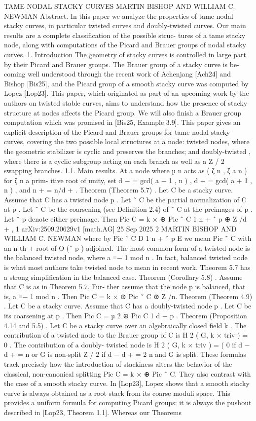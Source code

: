\documentclass{article}
\begin{document}
TAME NODAL STACKY CURVES MARTIN BISHOP AND WILLIAM C. NEWMAN Abstract. In this paper we analyze the properties of tame nodal stacky curves, in particular twisted curves and doubly-twisted curves. Our main results are a complete classification of the possible struc- tures of a tame stacky node, along with computations of the Picard and Brauer groups of nodal stacky curves. 1. Introduction The geometry of stacky curves is controlled in large part by their Picard and Brauer groups. The Brauer group of a stacky curve is be- coming well understood through the recent work of Achenjang [Ach24] and Bishop [Bis25], and the Picard group of a smooth stacky curve was computed by Lopez [Lop23]. This paper, which originated as part of an upcoming work by the authors on twisted stable curves, aims to understand how the presence of stacky structure at nodes affects the Picard group. We will also finish a Brauer group computation which was promised in [Bis25, Example 3.9]. This paper gives an explicit description of the Picard and Brauer groups for tame nodal stacky curves, covering the two possible local structures at a node: twisted nodes, where the geometric stabilizer is cyclic and preserves the branches; and doubly-twisted , where there is a cyclic subgroup acting on each branch as well as a Z / 2 swapping branches. 1.1. Main results. At a node where µ n acts as ( ζ n , ζ a n ) for ζ n a prim- itive root of unity, set d − = gcd( a − 1 , n ) , d + = gcd( a + 1 , n ) , and n + = n/d + . Theorem (Theorem 5.7) . Let C be a stacky curve. Assume that C has a twisted node p . Let ˜ C be the partial normalization of C at p . Let ˜ C be the coarsening (see Definition 2.4) of ˜ C at the preimages of p . Let ˆ p denote either preimage. Then Pic C = k × ⊕ Pic ˜ C 1 n + ˆ p ⊕ Z /d + , 1 arXiv:2509.20629v1  [math.AG]  25 Sep 2025 2 MARTIN BISHOP AND WILLIAM C. NEWMAN where by Pic ˜ C D 1 n + ˆ p E we mean Pic ˜ C with an n th + root of O (ˆ p ) adjoined. The most common form of a twisted node is the balanced twisted node, where a ≡− 1 mod n . In fact, balanced twisted node is what most authors take twisted node to mean in recent work. Theorem 5.7 has a strong simplification in the balanced case. Theorem (Corollary 5.8) . Assume that C is as in Theorem 5.7. Fur- ther assume that the node p is balanced, that is, a ≡− 1 mod n . Then Pic C = k × ⊕ Pic ˜ C ⊕ Z /n. Theorem (Theorem 4.9) . Let C be a stacky curve. Assume that C has a doubly-twisted node p . Let C be its coarsening at p . Then Pic C = µ 2 ⊕ Pic C 1 d − p . Theorem (Proposition 4.14 and 5.5) . Let C be a stacky curve over an algebraically closed field k . The contribution of a twisted node to the Brauer group of C is H 2 ( G, k × triv ) = 0 . The contribution of a doubly- twisted node is H 2 ( G, k × triv ) = ( 0 if d − d + = n or G is non-split Z / 2 if d − d + = 2 n and G is split. These formulas track precisely how the introduction of stackiness alters the behavior of the classical, non-canonical splitting Pic C = k × ⊕ Pic ˜ C. They also contrast with the case of a smooth stacky curve. In [Lop23], Lopez shows that a smooth stacky curve is always obtained as a root stack from its coarse moduli space. This provides a uniform formula for computing Picard groups: it is always the pushout described in [Lop23, Theorem 1.1]. Whereas our Theorems 
\end{document}
